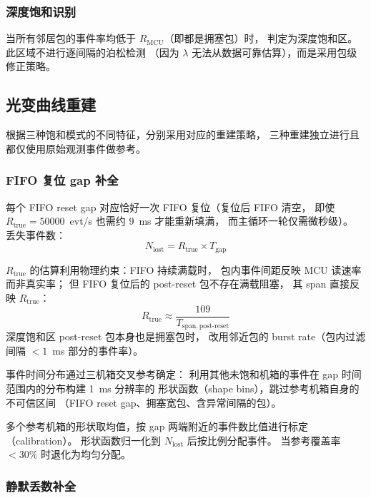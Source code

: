 \documentclass[aps,prd,twocolumn,nofootinbib,superscriptaddress]{revtex4-2}
\begin{document}
\subsubsection{深度饱和识别}

当所有邻居包的事件率均低于 $R_\mathrm{MCU}$（即都是拥塞包）时，
判定为深度饱和区。此区域不进行逐间隔的泊松检测
（因为 $\lambda$ 无法从数据可靠估算），而是采用包级修正策略。

\subsection{光变曲线重建}\label{sec:reconstruction}

根据三种饱和模式的不同特征，分别采用对应的重建策略，
三种重建独立进行且都仅使用原始观测事件做参考。

\subsubsection{FIFO 复位 gap 补全}

每个 FIFO reset gap 对应恰好一次 FIFO 复位（复位后 FIFO 清空，
即使 $R_\mathrm{true} = 50000$~evt/s 也需约 9~ms 才能重新填满，
而主循环一轮仅需微秒级）。
丢失事件数：
\begin{equation}\label{eq:nlost}
  N_\mathrm{lost} = R_\mathrm{true} \times T_\mathrm{gap}
\end{equation}

$R_\mathrm{true}$ 的估算利用物理约束：FIFO 持续满载时，
包内事件间距反映 MCU 读速率而非真实率；
但 FIFO 复位后的 post-reset 包不存在满载阻塞，
其 span 直接反映 $R_\mathrm{true}$：
\begin{equation}\label{eq:rtrue}
  R_\mathrm{true} \approx \frac{109}{T_\mathrm{span,post\text{-}reset}}
\end{equation}
深度饱和区 post-reset 包本身也是拥塞包时，
改用邻近包的 burst rate（包内过滤间隔 $< 1$~ms 部分的事件率）。

事件时间分布通过三机箱交叉参考确定：
利用其他未饱和机箱的事件在 gap 时间范围内的分布构建 1~ms 分辨率的
形状函数（shape bins），跳过参考机箱自身的不可信区间
（FIFO reset gap、拥塞宽包、含异常间隔的包）。

多个参考机箱的形状取均值，按 gap 两端附近的事件数比值进行标定（calibration）。
形状函数归一化到 $N_\mathrm{lost}$ 后按比例分配事件。
当参考覆盖率 $< 30\%$ 时退化为均匀分配。

\subsubsection{静默丢数补全}
\end{document}

